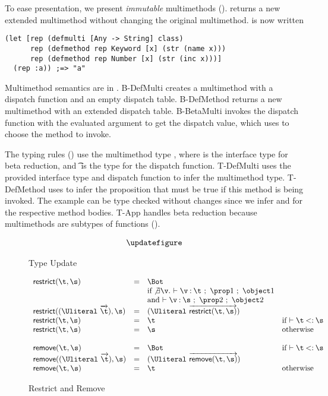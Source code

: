 To ease presentation, we present \emph{immutable}
multimethods ().  returns a new extended multimethod
without changing the original multimethod.  is now written
\begin{verbatim}
(let [rep (defmulti [Any -> String] class)
      rep (defmethod rep Keyword [x] (str (name x)))
      rep (defmethod rep Number [x] (str (inc x)))]
  (rep :a)) ;=> "a"
\end{verbatim}

Multimethod semantics are in .
B-DefMulti creates a multimethod with a dispatch function and an empty dispatch table.
B-DefMethod returns a new multimethod with an extended dispatch table.
B-BetaMulti invokes the dispatch function with the evaluated argument to get the dispatch value,
which \getmethodliteral{} uses to choose the method to invoke.

The typing rules () use the multimethod type {\MultiFntype{\s{}}{\t{}}}, 
where \s{} is the interface type for beta reduction, and \t{} is the type for
the dispatch function. T-DefMulti uses the provided interface type and dispatch function
to infer the multimethod type. T-DefMethod uses \isacompareliteral{} to infer the proposition
that must be true if this method is being invoked. The example can be type checked without
changes since we infer \isprop{\Number}{\x{}} and \isprop{\Keyword}{\x{}} for the respective
method bodies. T-App handles beta reduction because multimethods are subtypes of functions
().



\begin{figure*}
  $$
\begin{array}{lllll}
\updatefigure
\end{array}
$$
\caption{Type Update}
\label{main:figure:update}
\end{figure*}

\begin{figure}
  $$
\begin{array}{lllll}
  \restrictremovefigure{}
\end{array}
  $$
  \caption{Restrict and Remove}
  \label{main:figure:restrictremove}
\end{figure}
